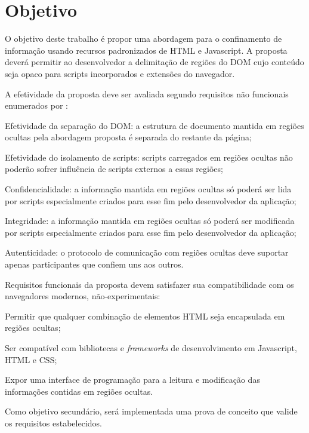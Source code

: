 \section{Objetivo}



O objetivo deste trabalho é propor uma abordagem para o confinamento de informação usando recursos padronizados de HTML e Javascript. A proposta deverá permitir ao desenvolvedor a delimitação de regiões do DOM cujo conteúdo seja opaco para scripts incorporados e extensões do navegador.

A efetividade da proposta deve ser avaliada segundo requisitos não funcionais enumerados por \cite{DeRyck2012}:

\begin{alineas}
	\item Efetividade da separação do DOM: a estrutura de documento mantida em regiões ocultas pela abordagem proposta é separada do restante da página;
	\item Efetividade do isolamento de scripts: scripts carregados em regiões ocultas não poderão sofrer influência de scripts externos a essas regiões;
	\item Confidencialidade: a informação mantida em regiões ocultas só poderá ser lida por scripts especialmente criados para esse fim pelo desenvolvedor da aplicação;
	\item Integridade: a informação mantida em regiões ocultas só poderá ser modificada por scripts especialmente criados para esse fim pelo desenvolvedor da aplicação;
	\item Autenticidade: o protocolo de comunicação com regiões ocultas deve suportar apenas participantes que confiem uns aos outros.
\end{alineas}

Requisitos funcionais da proposta devem satisfazer sua compatibilidade com os navegadores modernos, não-experimentais:

\begin{alineas}
	\item Permitir que qualquer combinação de elementos HTML seja encapsulada em regiões ocultas;
	\item Ser compatível com bibliotecas e \textit{frameworks} de desenvolvimento em Javascript, HTML e CSS;
	\item Expor uma interface de programação para a leitura e modificação das informações contidas em regiões ocultas.
\end{alineas}

Como objetivo secundário, será implementada uma prova de conceito que valide os requisitos estabelecidos.